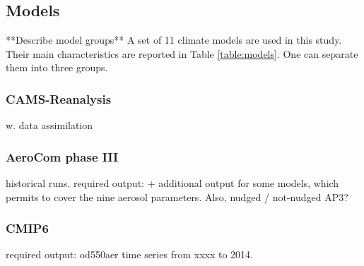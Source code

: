\documentclass[journal abbreviation, manuscript]{copernicus}
\begin{document}
\subsection{Models}
**Describe model groups**
A set of 11 climate models are used in this study. Their main characteristics are reported in Table \ref{table:models}.  One can separate them into three groups.

\subsubsection{CAMS-Reanalysis}
w. data assimilation

\subsubsection{AeroCom phase III}
historical runs.
required output: + additional output for some models, which permits to cover the nine aerosol parameters.
Also, nudged / not-nudged AP3?

\subsubsection{CMIP6}
required output: od550aer time series from xxxx to 2014.
\end{document}
